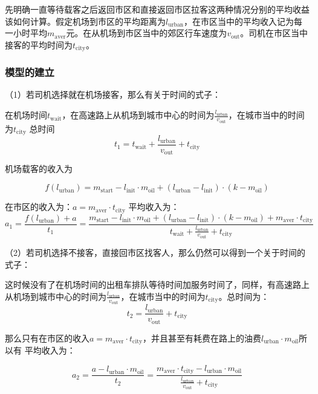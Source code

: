 \documentclass[withoutpreface,bwprint]{cumcmthesis} %
\begin{document}
先明确一直等待载客之后返回市区和直接返回市区拉客这两种情况分别的平均收益该如何计算。假定机场到市区的平均距离为$l_{\mathrm{urban}}$，在市区当中的平均收入记为每一小时平均$m_{\mathrm{aver}}$元。在从机场到市区当中的郊区行车速度为$v_{\mathrm{out}}$。司机在市区当中接客的平均时间为$t_{\mathrm{city}}$。
\par
\subsubsection{模型的建立}
（1）若司机选择就在机场接客，那么有关于时间的式子：\par
在机场时间$t_{ \mathrm{wait}}$，在高速路上从机场到城市中心的时间为$\frac{l_{\mathrm{urban}}}{v_{\mathrm{out}}}$，在城市当中的时间为$t_{\mathrm{city}} $ 总时间
\begin{equation}
	t_{1} =t_{ \mathrm{wait}}+\frac{l_{\mathrm{urban}}}{v_{\mathrm{out}}}+t_{\mathrm{city}}
\end{equation}\par
机场载客的收入为\par
$$f(l_{\mathrm{urban}}) = m_{\mathrm{start}}-l_{\mathrm{init}}\cdot m_{\mathrm{oil}}+(l_{\mathrm{urban}}-l_{\mathrm{init}})\cdot (k-m_{\mathrm{oil}}) $$\par
在市区的收入为：$a = m_{\mathrm{aver}}\cdot t_{\mathrm{city}}$
平均收入为：
$$a_{1}=\frac{f(l_{\mathrm{urban}})+a}{t_1}  = \frac{m_{\mathrm{start}}-l_{\mathrm{init}}\cdot m_{\mathrm{oil}}+(l_{\mathrm{urban}}-l_{\mathrm{init}})\cdot (k-m_{\mathrm{oil}})+ m_{\mathrm{aver}}\cdot t_{\mathrm{city}}}{t_{ \mathrm{wait}}+\frac{l_{\mathrm{urban}}}{v_{\mathrm{out}}}+t_{\mathrm{city}}} $$\par

\par \par
（2）若司机选择不接客，直接回市区找客人，那么仍然可以得到一个关于时间的式子：\par
这时候没有了在机场时间的出租车排队等待时间加服务时间了，同样，有高速路上从机场到城市中心的时间为$\frac{l_{\mathrm{urban}}}{v_{\mathrm{out}}}$，在城市当中的时间为$t_{\mathrm{city}} $。总时间为：
$$ t_{2} = \frac{l_{\mathrm{urban}}}{v_{\mathrm{out}}}+t_{\mathrm{city}} $$\par
那么只有在市区的收入$a = m_{\mathrm{aver}}\cdot t_{\mathrm{city}}$，并且甚至有耗费在路上的油费$l_{\mathrm{urban}}\cdot m_{\mathrm{oil}} $所以有 平均收入为：\par
\begin{equation}
	a_2=\frac{a-l_{\mathrm{urban}}\cdot m_{\mathrm{oil}}}{t_{2}}=\frac{m_{\mathrm{aver}}\cdot t_{\mathrm{city}}-l_{\mathrm{urban}}\cdot m_{\mathrm{oil}}}{\frac{l_{\mathrm{urban}}}{v_{\mathrm{out}}}+t_{\mathrm{city}} }
\end{equation}\par
\end{document}
